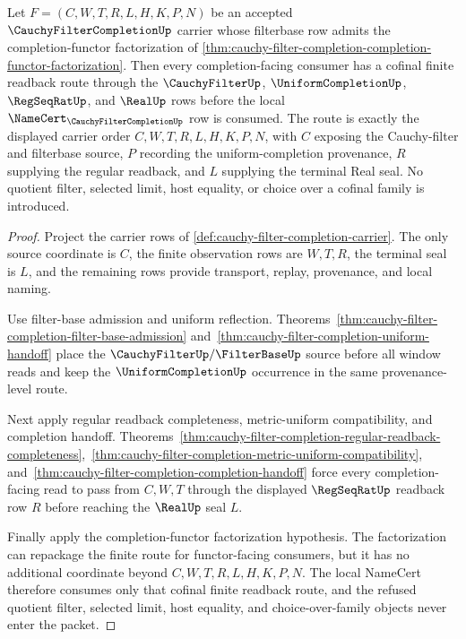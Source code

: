 \begin{theorem}
\label{thm:cauchy-filter-completion-cofinal-regular-readback}
Let $F=(C,W,T,R,L,H,K,P,N)$ be an accepted $\CauchyFilterCompletionUp$ carrier whose filterbase row admits the completion-functor factorization of \autoref{thm:cauchy-filter-completion-completion-functor-factorization}. Then every completion-facing consumer has a cofinal finite readback route through the $\CauchyFilterUp$, $\UniformCompletionUp$, $\RegSeqRatUp$, and $\RealUp$ rows before the local $\NameCert_{\CauchyFilterCompletionUp}$ row is consumed. The route is exactly the displayed carrier order $C,W,T,R,L,H,K,P,N$, with $C$ exposing the Cauchy-filter and filterbase source, $P$ recording the uniform-completion provenance, $R$ supplying the regular readback, and $L$ supplying the terminal Real seal. No quotient filter, selected limit, host equality, or choice over a cofinal family is introduced.
\end{theorem}
\begin{proof}
Project the carrier rows of \autoref{def:cauchy-filter-completion-carrier}. The only source coordinate is $C$, the finite observation rows are $W,T,R$, the terminal seal is $L$, and the remaining rows provide transport, replay, provenance, and local naming.

Use filter-base admission and uniform reflection. Theorems~\ref{thm:cauchy-filter-completion-filter-base-admission} and~\ref{thm:cauchy-filter-completion-uniform-handoff} place the $\CauchyFilterUp/\FilterBaseUp$ source before all window reads and keep the $\UniformCompletionUp$ occurrence in the same provenance-level route.

Next apply regular readback completeness, metric-uniform compatibility, and completion handoff. Theorems~\ref{thm:cauchy-filter-completion-regular-readback-completeness},~\ref{thm:cauchy-filter-completion-metric-uniform-compatibility}, and~\ref{thm:cauchy-filter-completion-completion-handoff} force every completion-facing read to pass from $C,W,T$ through the displayed $\RegSeqRatUp$ readback row $R$ before reaching the $\RealUp$ seal $L$.

Finally apply the completion-functor factorization hypothesis. The factorization can repackage the finite route for functor-facing consumers, but it has no additional coordinate beyond $C,W,T,R,L,H,K,P,N$. The local NameCert therefore consumes only that cofinal finite readback route, and the refused quotient filter, selected limit, host equality, and choice-over-family objects never enter the packet.
\end{proof}

